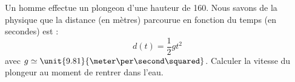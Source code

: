 
\begin{exercice}\label{exosmath-0374}

    Un homme effectue un plongeon d'une hauteur de \unit{160}{\meter}. Nous savons de la physique que la distance (en mètres) parcourue en fonction du temps (en secondes) est :
    \begin{equation}
        d(t)=\frac{ 1 }{2}gt^2
    \end{equation}
    avec \( g\simeq\unit{9.81}{\meter\per\second\squared}\). Calculer la vitesse du plongeur au moment de rentrer dans l'eau.

\end{exercice}
